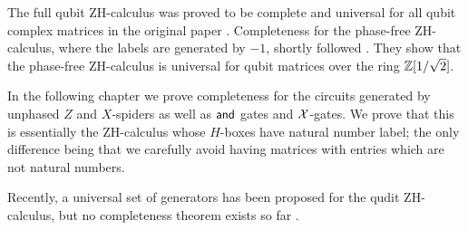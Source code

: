 The full qubit ZH-calculus was proved to be complete and universal for all qubit complex matrices in the original paper \cite{zh}.  Completeness for the phase-free ZH-calculus, where the labels are generated by $-1$, shortly followed \cite{zhpi}.  They show that the phase-free ZH-calculus is universal for qubit matrices over the ring $\mathbb{Z}[1/\sqrt{2}]$.


In the following chapter we prove completeness for the circuits generated by unphased $Z$ and $X$-spiders as well as ${\sf and}$ gates and $\cal X$-gates.  We prove that this is essentially the ZH-calculus whose $H$-boxes have natural number label; the only difference being that we carefully avoid having matrices with entries which are not natural numbers.

Recently, a universal set of generators has been proposed for the qudit ZH-calculus, but no completeness theorem exists so far \cite{roy}.




%
%
%
